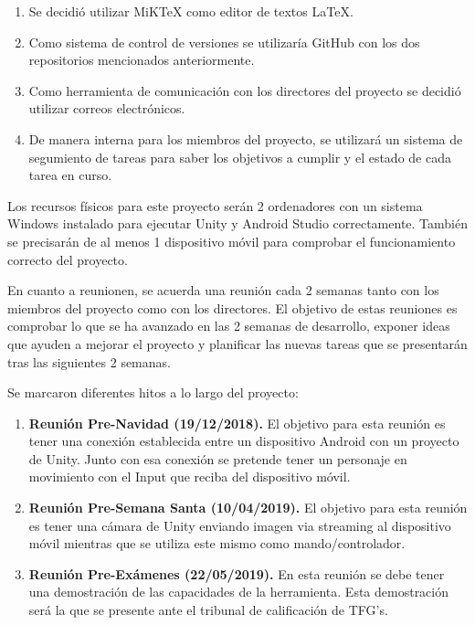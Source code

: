 \begin{enumerate}

\item Se decidi\'o utilizar MiKTeX como editor de textos LaTeX.
\item Como sistema de control de versiones se utilizar\'ia GitHub con los dos repositorios mencionados anteriormente.
\item Como herramienta de comunicaci\'on con los directores del proyecto se decidi\'o utilizar correos electr\'onicos.
\item De manera interna para los miembros del proyecto, se utilizar\'a un sistema de segumiento de tareas para saber los objetivos a cumplir y el estado de cada tarea en curso.

\end{enumerate}

Los recursos f\'isicos para este proyecto ser\'an 2 ordenadores con un sistema Windows instalado para ejecutar Unity y Android Studio correctamente. Tambi\'en se precisar\'an de al menos 1 dispositivo m\'ovil para comprobar el funcionamiento correcto del proyecto.

En cuanto a reunionen, se acuerda una reuni\'on cada 2 semanas tanto con los miembros del proyecto como con los directores. El objetivo de estas reuniones es comprobar lo que se ha avanzado en las 2 semanas de desarrollo, exponer ideas que ayuden a mejorar el proyecto y planificar las nuevas tareas que se presentar\'an tras las siguientes 2 semanas. 

Se marcaron diferentes hitos a lo largo del proyecto:

\begin{enumerate}

\item \textbf{ Reuni\'on Pre-Navidad (19/12/2018).} El objetivo para esta reuni\'on es tener una conexi\'on establecida entre un dispositivo Android con un proyecto de Unity. Junto con esa conexi\'on se pretende tener un personaje en movimiento con el Input que reciba del dispositivo m\'ovil.
\item \textbf{ Reuni\'on Pre-Semana Santa (10/04/2019).}  El objetivo para esta reuni\'on es tener una c\'amara de Unity enviando imagen via streaming al dispositivo m\'ovil mientras que se utiliza este mismo como mando/controlador.
\item \textbf{ Reuni\'on Pre-Ex\'amenes (22/05/2019).} En esta reuni\'on se debe tener una demostraci\'on de las capacidades de la herramienta. Esta demostraci\'on ser\'a la que se presente ante el tribunal de calificaci\'on de TFG's.
\end{enumerate}


